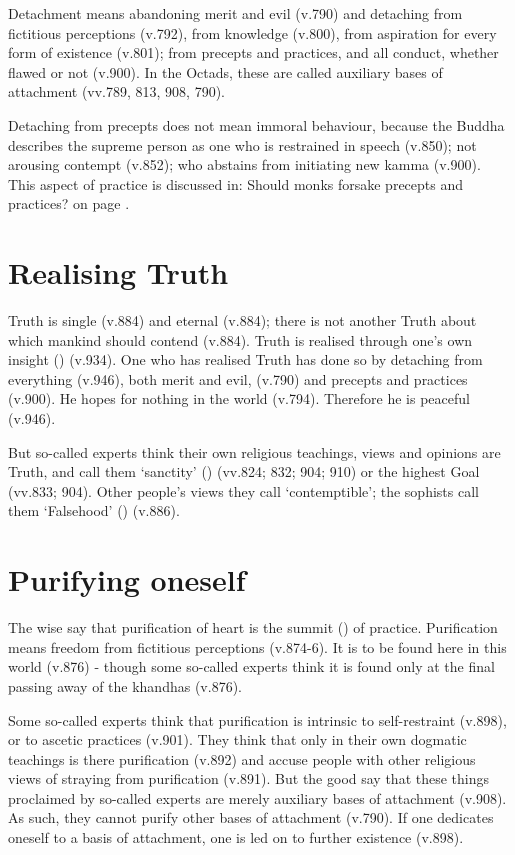 Detachment means abandoning merit and evil (v.790) and detaching from fictitious perceptions (v.792), from knowledge (v.800), from aspiration for every form of existence (v.801); from precepts and practices, and all conduct, whether flawed or not (v.900). In the Octads, these are called auxiliary bases of attachment (vv.789, 813, 908, 790).

Detaching from precepts does not mean immoral behaviour, because the Buddha describes the supreme person as one who is restrained in speech (v.850); not arousing contempt (v.852); who abstains from initiating new kamma (v.900). This aspect of practice is discussed in: Should monks forsake precepts and practices? on page \pageref{should-monks-forsake}.

\section*{Realising Truth}

Truth is single (v.884) and eternal (v.884); there is not another Truth about which mankind should contend (v.884). Truth is realised through one's own insight () (v.934). One who has realised Truth has done so by detaching from everything (v.946), both merit and evil, (v.790) and precepts and practices (v.900). He hopes for nothing in the world (v.794). Therefore he is peaceful (v.946).

But so-called experts think their own religious teachings, views and opinions are Truth, and call them `sanctity' () (vv.824; 832; 904; 910) or the highest Goal (vv.833; 904). Other people's views they call `contemptible'; the sophists call them `Falsehood' () (v.886).

\section*{Purifying oneself}

The wise say that purification of heart is the summit () of practice. Purification means freedom from fictitious perceptions (v.874-6). It is to be found here in this world (v.876) - though some so-called experts think it is found only at the final passing away of the khandhas (v.876).

Some so-called experts think that purification is intrinsic to self-restraint (v.898), or to ascetic practices (v.901). They think that only in their own dogmatic teachings is there purification (v.892) and accuse people with other religious views of straying from purification (v.891). But the good say that these things proclaimed by so-called experts are merely auxiliary bases of attachment (v.908). As such, they cannot purify other bases of attachment (v.790). If one dedicates oneself to a basis of attachment, one is led on to further existence (v.898).

